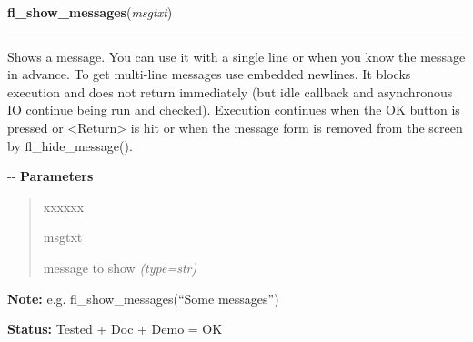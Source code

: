 \hspace{.8\funcindent}\begin{boxedminipage}{\funcwidth}

    \raggedright \textbf{fl\_show\_messages}(\textit{msgtxt})

    \vspace{-1.5ex}

    \rule{\textwidth}{0.5\fboxrule}
\setlength{\parskip}{2ex}

Shows a message. You can use it with a single line or when you
know the message in advance. To get multi-line messages use embedded
newlines. It blocks execution and does not return immediately (but idle
callback and asynchronous IO continue being run and checked). Execution
continues when the OK button is pressed or <Return> is hit or when the
message form is removed from the screen by fl\_hide\_message().

-{}-
\setlength{\parskip}{1ex}
      \textbf{Parameters}
      \vspace{-1ex}

      \begin{quote}
        \begin{Ventry}{xxxxxx}

          \item[msgtxt]


message to show
            {\it (type=str)}

        \end{Ventry}

      \end{quote}

\textbf{Note:} 
e.g. fl\_show\_messages(``Some messages'')


\textbf{Status:} 
Tested + Doc + Demo = OK


    \end{boxedminipage}

    \label{xformslib:flgoodies:fl_show_msg}

    \vspace{0.5ex}

